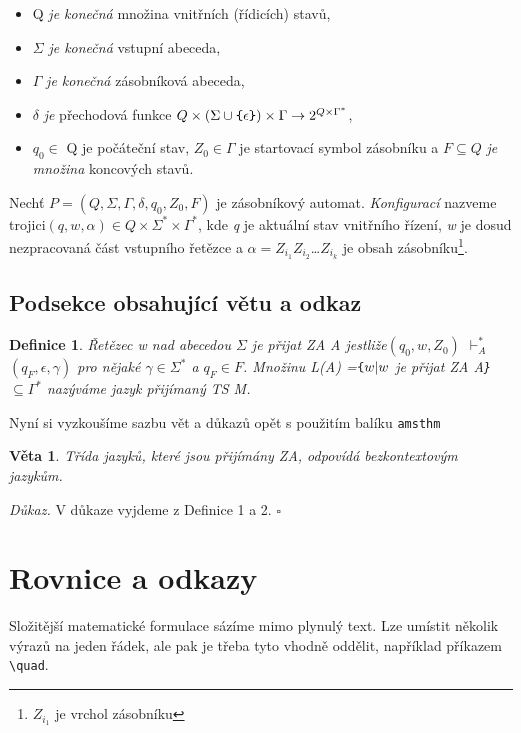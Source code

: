 \documentclass[twocolumn,a4paper,11pt]{article}
\newtheorem{definice}{Definice}
\newtheorem{veta}{Věta}
\begin{document}
\begin{itemize}
    \item Q \emph{je konečná} množina vnitřních (řídicích) stavů,
    \item  
     \(\Sigma\) \emph{je konečná}  vstupní abeceda,
    \item
    \(\Gamma\) \emph{je konečná}  zásobníková abeceda,
    \item
    \(\delta\) \emph{je} přechodová funkce \(Q \times (\Sigma\cup\verb|{|\epsilon\verb|}|) \times \Gamma \rightarrow 2^{Q\times\Gamma^*}\),
    \item
    \(q_0\in\) Q je počáteční stav, \(Z_0\in\Gamma\) je startovací symbol zásobníku a \(F\subseteq Q\) \emph{je množina} koncových stavů.
\end{itemize}

\par Nechť \(P=(Q,\Sigma,\Gamma,\delta,q_0,Z_0,F)\) je zásobníkový automat. \emph{Konfigurací} nazveme trojici\((q,w,\alpha)\in Q\times\Sigma^*\times\Gamma^*\), kde \emph{q} je aktuální stav vnitřního řízení, \emph{w} je dosud nezpracovaná část vstupního řetězce a \( \alpha=Z_{i_1}Z_{i_2}\)\dots\(Z_{i_k}\) je obsah zásobníku\footnote{$Z_{i_1}$ je vrchol zásobníku}.

\subsection{Podsekce obsahující větu a odkaz}
\begin{definice}
\emph{Řetězec} w \emph{nad abecedou} \(\Sigma\) je přijat ZA \emph{A} \emph{jestliže}\((q_0,w,Z_0)\) $\vdash_{A}^{*}$ \((q_F,\epsilon,\gamma)\) pro nějaké \(\gamma \in \Sigma^*\) a \(q_F\in F\). Množinu L(A) =\(\verb|{|w|w\) je přijat ZA \emph{A}\verb|}| \(\subseteq\Gamma^*\) nazýváme \emph{jazyk přijímaný TS} M.


\end{definice}

\par Nyní si vyzkoušíme sazbu vět a důkazů opět s použitím balíku \texttt{amsthm}

\begin{veta}
Třída jazyků, které jsou přijímány ZA, odpovídá \emph{bezkontextovým jazykům.}
\end{veta}
\begin{flushleft}
\emph{Důkaz.} V důkaze vyjdeme z Definice 1 a 2. \hfill$\square$
\end{flushleft}
\section{Rovnice a odkazy}
Složitější matematické formulace sázíme mimo plynulý text. Lze umístit několik výrazů na jeden řádek, ale pak je třeba tyto vhodně oddělit, například příkazem \verb|\quad|.
\break
\end{document}
